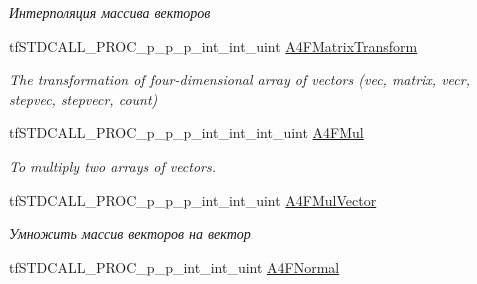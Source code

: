 \begin{DoxyCompactItemize}
\begin{DoxyCompactList}\small\item\em Интерполяция массива векторов \end{DoxyCompactList}\item 
\hypertarget{structs_functions_array_vector_c_p_u_a9a7ced821d1c597ecad7a7b90741f47d}{tf\-S\-T\-D\-C\-A\-L\-L\-\_\-\-P\-R\-O\-C\-\_\-p\-\_\-p\-\_\-p\-\_\-int\-\_\-int\-\_\-uint \hyperlink{structs_functions_array_vector_c_p_u_a9a7ced821d1c597ecad7a7b90741f47d}{A4\-F\-Matrix\-Transform}}\label{structs_functions_array_vector_c_p_u_a9a7ced821d1c597ecad7a7b90741f47d}

\begin{DoxyCompactList}\small\item\em The transformation of four-\/dimensional array of vectors (vec, matrix, vecr, stepvec, stepvecr, count) \end{DoxyCompactList}\item 
\hypertarget{structs_functions_array_vector_c_p_u_aabd2a65ba2478a2fb8655b8042fca791}{tf\-S\-T\-D\-C\-A\-L\-L\-\_\-\-P\-R\-O\-C\-\_\-p\-\_\-p\-\_\-p\-\_\-int\-\_\-int\-\_\-int\-\_\-uint \hyperlink{structs_functions_array_vector_c_p_u_aabd2a65ba2478a2fb8655b8042fca791}{A4\-F\-Mul}}\label{structs_functions_array_vector_c_p_u_aabd2a65ba2478a2fb8655b8042fca791}

\begin{DoxyCompactList}\small\item\em To multiply two arrays of vectors. \end{DoxyCompactList}\item 
\hypertarget{structs_functions_array_vector_c_p_u_a3b6dea3ed14c6d7f425722d04b52c374}{tf\-S\-T\-D\-C\-A\-L\-L\-\_\-\-P\-R\-O\-C\-\_\-p\-\_\-p\-\_\-p\-\_\-int\-\_\-int\-\_\-uint \hyperlink{structs_functions_array_vector_c_p_u_a3b6dea3ed14c6d7f425722d04b52c374}{A4\-F\-Mul\-Vector}}\label{structs_functions_array_vector_c_p_u_a3b6dea3ed14c6d7f425722d04b52c374}

\begin{DoxyCompactList}\small\item\em Умножить массив векторов на вектор \end{DoxyCompactList}\item 
\hypertarget{structs_functions_array_vector_c_p_u_a6026f5ddcae22669f93ed1fc6b2f7bac}{tf\-S\-T\-D\-C\-A\-L\-L\-\_\-\-P\-R\-O\-C\-\_\-p\-\_\-p\-\_\-int\-\_\-int\-\_\-uint \hyperlink{structs_functions_array_vector_c_p_u_a6026f5ddcae22669f93ed1fc6b2f7bac}{A4\-F\-Normal}}\label{structs_functions_array_vector_c_p_u_a6026f5ddcae22669f93ed1fc6b2f7bac}


\end{DoxyCompactItemize}
